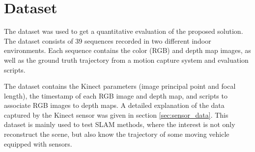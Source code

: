 \section{Dataset}

The dataset \cite{sturm12iros} was used to get a quantitative evaluation 
of the proposed solution. The dataset consists of 39 sequences recorded in
two different indoor environments. Each sequence contains
the color (RGB) and depth map images, as well as the ground truth
trajectory from a motion capture system and  evaluation 
scripts.

The dataset contains the Kinect parameters (image principal point and focal length), the timestamp of each RGB image and depth map, 
and scripts to associate RGB images to depth maps. A detailed explanation of the data captured 
by the Kinect sensor was given in section \ref{sec:sensor_data}. This dataset is mainly used to test SLAM methods, where the 
interest is not only reconstruct the scene, but also know the trajectory of some moving vehicle equipped with
 sensors.
